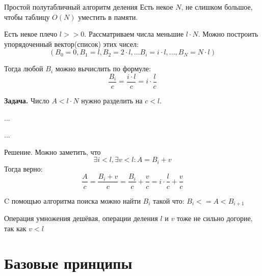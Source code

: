 \begin{frame}{Простой полутабличный алгоритм деления}\label{frame:example_table_method}
	Есть некое $N$, не слишком большое, чтобы таблицу $O(N)$ уместить в памяти.
	
	Есть некое плечо $l>>0$. Рассматриваем числа меньшие $l \cdot N$. 
	Можно построить упорядоченный вектор(список) этих чисел:
	\begin{equation}\label{eq:example_table_method_vector_def}
	(B_0=0, B_1 = l, B_2 = 2 \cdot l, ... B_i = i \cdot l, ..., B_N = N \cdot l )
	\end{equation} 
	
	Тогда любой $B_i$ можно вычислить по формуле:
	\begin{equation}\label{eq:example_table_method_B_i}
	\frac{B_i}{c} = \frac{i \cdot l}{c} = i \cdot \frac{l}{c}
	\end{equation}
	
	
 
 	\textbf{Задача.} Число $A < l \cdot N$ нужно разделить на $c<l$.
	
	...
\end{frame}
\begin{frame}
 	...
 	
 	Решение. Можно заметить, что 
 	\begin{equation}
 	\exists i<l, \exists v<l: A = B_i+v
 	\end{equation}
 	Тогда верно:
 	\begin{equation}
 	\frac{A}{c} = \frac{B_i+v}{c} = \frac{B_i}{c} + \frac{v}{c} = i \cdot \frac{l}{c} + \frac{v}{c}
 	\end{equation}
 	
 	C помощью алгоритма поиска можно найти $B_i$ такой что: $B_i <= A < B_{i+1}$ %
 	
 	Операция умножения дешёвая, операции деления $l$ и $v$ тоже не сильно догорие, 
 	так как $v<l$
 	
 	
 
		
	
\end{frame}

\section{Базовые принципы}\label{section:base_principles}

